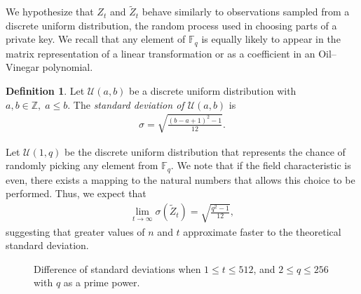 \documentclass[english]{ufsc-thesis-rn46-2019/ufsc-thesis-rn46-2019}
\theoremstyle{definition}
\newtheorem{definition}[theorem]{Definition}
\begin{document}
We hypothesize that $Z_{t}$ and $\widetilde{Z}_{t}$ behave similarly to
observations sampled from a discrete uniform distribution, the random process
used in choosing parts of a private key. We recall that any element of
$\mathbb{F}_{q}$ is equally likely to appear in the matrix representation of
a linear transformation or as a coefficient in an Oil--Vinegar polynomial.

\begin{definition}
  Let $\mathcal{U}(a, b)$ be a discrete uniform distribution with
  $a, b \in \mathbb{Z},\; a \leq b$. The \emph{standard deviation of
  $\mathcal{U}(a, b)$} is
  \begin{align}
    \sigma = \sqrt{\frac{{(b - a + 1)}^{2} - 1}{12}}.
  \end{align}
\end{definition}

Let $\mathcal{U}(1, q)$ be the discrete uniform distribution that represents
the chance of randomly picking any element from $\mathbb{F}_{q}$. We note that
if the field characteristic is even, there exists a mapping to the natural
numbers that allows this choice to be performed. Thus, we expect that
\begin{align}
  \lim_{t \to \infty} \sigma(\widetilde{Z}_{t}) = \sqrt{\frac{q^{2} - 1}{12}},
\end{align}
suggesting that greater values of $n$ and $t$ approximate faster to the
theoretical standard deviation.

\begin{figure}[htbp]
  \caption{Difference of standard deviations when $1 \leq t \leq 512$,
    and $2 \leq q \leq 256$ with $q$ as a prime power.}\label{fig:std-diff}
\end{figure}
\end{document}
